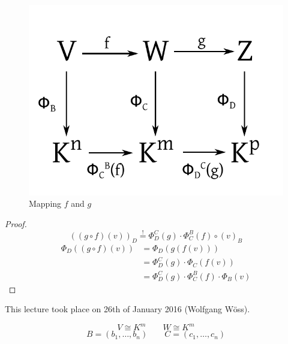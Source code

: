 \documentclass[a4paper,landscape,twocolumn]{article}
\newcommand\meta[3]{This #1 took place on #2 (#3).\par}
\begin{document}
\begin{figure}[!h]
  \begin{center}
    \includegraphics{img/two_linear_mappings.pdf}
    \caption{Mapping $f$ and $g$}
    \label{img:two-linear-mappings}
  \end{center}
\end{figure}

\begin{proof}
  \[ ((g \circ f) (v))_D \overset!= \Phi_D^C(g) \cdot  \Phi_C^B(f) \circ (v)_B \]
  \begin{align*}
    \Phi_D((g \circ f)(v)) &= \Phi_D(g(f(v))) \\
      &= \Phi_D^C(g) \cdot \Phi_C(f(v)) \\
      &= \Phi_D^C(g) \cdot \Phi_C^B(f) \cdot \Phi_B(v)
  \end{align*}
\end{proof}

\meta{lecture}{26th of January 2016}{Wolfgang Wöss}

\[ V \cong K^m \qquad W \cong K^m \]
\[ B = (b_1, \ldots, b_n)  \qquad  C = (c_1, \ldots, c_n)  \]
\end{document}
